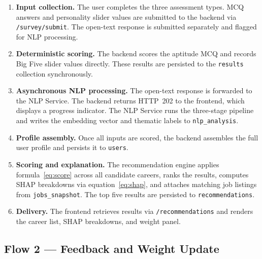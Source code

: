 \begin{enumerate}
  \item \textbf{Input collection.} The user completes the three assessment
        types. MCQ answers and personality slider values are submitted to the
        backend via \texttt{/survey/submit}. The open-text response is submitted
        separately and flagged for NLP processing.

  \item \textbf{Deterministic scoring.} The backend scores the aptitude MCQ
        and records Big Five slider values directly. These results are persisted
        to the \texttt{results} collection synchronously.

  \item \textbf{Asynchronous NLP processing.} The open-text response is
        forwarded to the NLP Service. The backend returns HTTP~202 to the
        frontend, which displays a progress indicator. The NLP Service runs the
        three-stage pipeline and writes the embedding vector and thematic labels
        to \texttt{nlp\_analysis}.

  \item \textbf{Profile assembly.} Once all inputs are scored, the backend
        assembles the full user profile and persists it to \texttt{users}.

  \item \textbf{Scoring and explanation.} The recommendation engine applies
        formula~\eqref{eq:score} across all candidate careers, ranks the
        results, computes SHAP breakdowns via equation~\eqref{eq:shap}, and
        attaches matching job listings from \texttt{jobs\_snapshot}. The top
        five results are persisted to \texttt{recommendations}.

  \item \textbf{Delivery.} The frontend retrieves results via
        \texttt{/recommendations} and renders the career list, SHAP
        breakdowns, and weight panel.
\end{enumerate}

\subsection*{Flow 2 --- Feedback and Weight Update}

